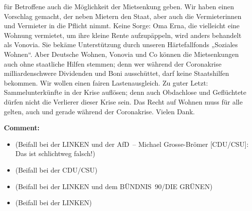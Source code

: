 \documentclass{article}
\begin{document}
für Betroffene auch die Möglichkeit der Mietsenkung geben. Wir haben einen Vorschlag gemacht, der neben Mietern den Staat, aber auch die Vermieterinnen und Vermieter in die Pflicht nimmt. Keine Sorge: Oma Erna, die vielleicht eine Wohnung vermietet, um ihre kleine Rente aufzupäppeln, wird anders behandelt als Vonovia. Sie bekäme Unterstützung durch unseren Härtefallfonds „Soziales Wohnen“. Aber Deutsche Wohnen, Vonovia und Co können die Mietsenkungen auch ohne staatliche Hilfen stemmen; denn wer während der Coronakrise milliardenschwere Dividenden und Boni ausschüttet, darf keine Staatshilfen bekommen. Wir wollen einen fairen Lastenausgleich. Zu guter Letzt: Sammelunterkünfte in der Krise auflösen; denn auch Obdachlose und Geflüchtete dürfen nicht die Verlierer dieser Krise sein. Das Recht auf Wohnen muss für alle gelten, auch und gerade während der Coronakrise. Vielen Dank.  

\noindent\textbf{Comment:}
\begin{itemize}
    \setlength\itemsep{-3pt}
    \item (Beifall bei der LINKEN und der AfD – Michael Grosse-Brömer [CDU/CSU]: Das ist schlichtweg falsch!)
    \setlength\itemsep{-3pt}
    \item (Beifall bei der CDU/CSU)
    \setlength\itemsep{-3pt}
    \item (Beifall bei der LINKEN und dem BÜNDNIS 90/DIE GRÜNEN)
    \setlength\itemsep{-3pt}
    \item (Beifall bei der LINKEN)
\end{itemize}
\end{document}
